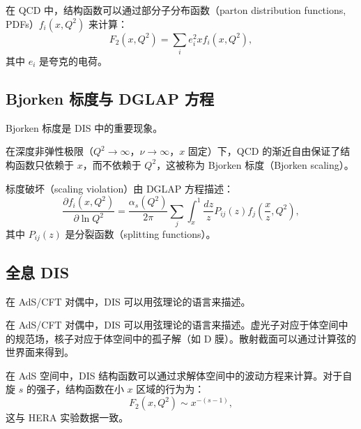 \begin{proposition}[结构函数与部分子分布函数]
在 QCD 中，结构函数可以通过部分子分布函数（parton distribution functions, PDFs）$f_i(x, Q^2)$ 来计算：
\begin{equation}
    F_2(x, Q^2) = \sum_i e_i^2 x f_i(x, Q^2),
\end{equation}
其中 $e_i$ 是夸克的电荷。
\end{proposition}

\subsection{Bjorken 标度与 DGLAP 方程}

Bjorken 标度是 DIS 中的重要现象。

\begin{definition}[Bjorken 标度]
在深度非弹性极限（$Q^2 \to \infty$，$\nu \to \infty$，$x$ 固定）下，QCD 的渐近自由保证了结构函数只依赖于 $x$，而不依赖于 $Q^2$，这被称为 Bjorken 标度（Bjorken scaling）。
\end{definition}

\begin{proposition}[DGLAP 方程]
标度破坏（scaling violation）由 DGLAP 方程描述：
\begin{equation}
    \frac{\partial f_i(x, Q^2)}{\partial \ln Q^2} = \frac{\alpha_s(Q^2)}{2\pi} \sum_j \int_x^1 \frac{dz}{z} P_{ij}(z) f_j\left(\frac{x}{z}, Q^2\right),
\end{equation}
其中 $P_{ij}(z)$ 是分裂函数（splitting functions）。
\end{proposition}

\subsection{全息 DIS}

在 AdS/CFT 对偶中，DIS 可以用弦理论的语言来描述。

\begin{definition}[全息 DIS]
在 AdS/CFT 对偶中，DIS 可以用弦理论的语言来描述。虚光子对应于体空间中的规范场，核子对应于体空间中的孤子解（如 D 膜）。散射截面可以通过计算弦的世界面来得到。
\end{definition}

\begin{proposition}
在 AdS 空间中，DIS 结构函数可以通过求解体空间中的波动方程来计算。对于自旋 $s$ 的强子，结构函数在小 $x$ 区域的行为为：
\begin{equation}
    F_2(x, Q^2) \sim x^{-(s-1)},
\end{equation}
这与 HERA 实验数据一致。
\end{proposition}


